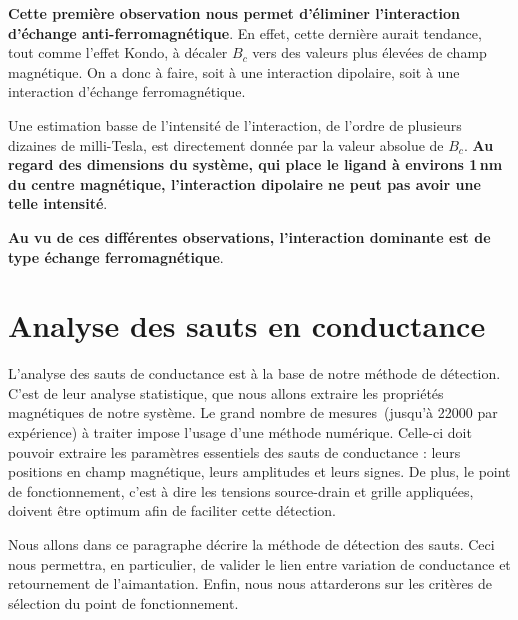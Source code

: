 \textbf{Cette première observation nous permet d'éliminer l'interaction d'échange anti-ferromagnétique}. En effet, cette dernière aurait tendance, tout comme l'effet Kondo, à décaler $B_c$ vers des valeurs plus élevées de champ magnétique. On a donc à faire, soit à une interaction dipolaire, soit à une interaction d'échange ferromagnétique.

Une estimation basse de l'intensité de l'interaction, de l'ordre de plusieurs dizaines de milli-Tesla, est directement donnée par la valeur absolue de $B_c$. \textbf{Au regard des dimensions du système, qui place le ligand à environs 1\,nm du centre magnétique, l'interaction dipolaire ne peut pas avoir une telle intensité}. 

\textbf{Au vu de ces différentes observations, l'interaction dominante est de type échange ferromagnétique}.

\section{Analyse des sauts en conductance}
L'analyse des sauts de conductance est à la base de notre méthode de détection. C'est de leur analyse statistique, que nous allons extraire les propriétés magnétiques de notre système. Le grand nombre de mesures~(jusqu'à 22000 par expérience) à traiter impose l'usage d'une méthode numérique. Celle-ci doit pouvoir extraire les paramètres essentiels des sauts de conductance : leurs positions en champ magnétique, leurs amplitudes et leurs signes. De plus, le point de fonctionnement, c'est à dire les tensions source-drain et grille appliquées, doivent être optimum afin de faciliter cette détection. 

Nous allons dans ce paragraphe décrire la méthode de détection des sauts. Ceci nous permettra, en particulier, de valider le lien entre variation de conductance et retournement de l'aimantation. Enfin, nous nous attarderons sur les critères de sélection du point de fonctionnement.

